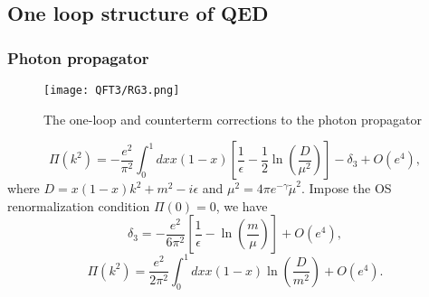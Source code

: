 \subsection{One loop structure of QED}
\subsubsection{Photon propagator}
\begin{figure}[!h]
\centering
\texttt{[image: QFT3/RG3.png]}
\caption{The one-loop and counterterm corrections to the photon propagator}
\end{figure}
\[\Pi(k^2) = -\frac{e^2}{\pi^2} \int_0^1 dx x(1-x) \left[ \frac{1}{\epsilon} - \frac{1}{2}\ln(\frac{D}{\mu^2})\right] - \delta_3 + O(e^4),\]
where $D = x(1-x)k^2+m^2-i\epsilon$ and $\mu^2 = 4\pi e^{-\gamma} \tilde{\mu}^2$.
Impose the OS renormalization condition $\Pi(0) = 0$, we have
\[\delta_3 = -\frac{e^2}{6\pi^2} \left[ \frac{1}{\epsilon} - \ln(\frac{m}{\mu})\right] + O(e^4),\]
\[\Pi(k^2) = \frac{e^2}{2\pi^2} \int_0^1 dx x(1-x) \ln(\frac{D}{m^2}) + O(e^4).\]

